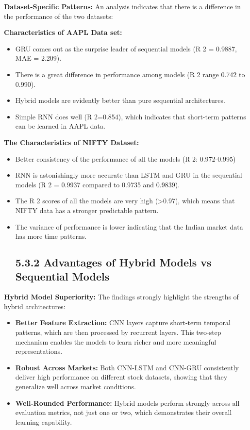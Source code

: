 \documentclass[12pt,a4paper]{report}
\begin{document}
\textbf{Dataset-Specific Patterns:} An analysis indicates that there is a difference in the performance of the two datasets:

\textbf{Characteristics of AAPL Data set:}

\begin{itemize}
  \item GRU comes out as the surprise leader of sequential models (R 2 = 0.9887, MAE = 2.209).
  \item There is a great difference in performance among models (R 2 range 0.742 to 0.990).
  \item Hybrid models are evidently better than pure sequential architectures.
  \item Simple RNN does well (R 2=0.854), which indicates that short-term patterns can be learned in AAPL data.
\end{itemize}

\textbf{The Characteristics of NIFTY Dataset:} 

\begin{itemize}
  \item Better consistency of the performance of all the models (R 2: 0.972-0.995)
  \item RNN is astonishingly more accurate than LSTM and GRU in the sequential models (R 2 = 0.9937 compared to 0.9735 and 0.9839).
  \item The R 2 scores of all the models are very high (>0.97), which means that NIFTY data has a stronger predictable pattern.
  \item The variance of performance is lower indicating that the Indian market data has more time patterns.
\subsection{5.3.2 Advantages of Hybrid Models vs Sequential Models}
\end{itemize}

\textbf{Hybrid Model Superiority: }The findings strongly highlight the strengths of hybrid architectures:

\begin{itemize}
  \item \textbf{Better Feature Extraction:} CNN layers capture short-term temporal patterns, which are then processed by recurrent layers. This two-step mechanism enables the models to learn richer and more meaningful representations.
  \item \textbf{Robust Across Markets:} Both CNN-LSTM and CNN-GRU consistently deliver high performance on different stock datasets, showing that they generalize well across market conditions.
  \item \textbf{Well-Rounded Performance:} Hybrid models perform strongly across all evaluation metrics, not just one or two, which demonstrates their overall learning capability.
\end{itemize}
\end{document}
